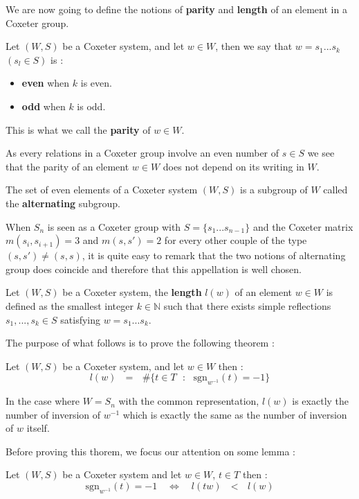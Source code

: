 \documentclass[envcountsame,envcountchap]{svmono}
\newcommand{\N}{\mathbb N}
\newcommand{\tg}[1]{\textbf{#1}}
\newcommand{\q}{\quad}
\newcommand{\qq}{\text{ }}
\begin{document}
	We are now going to define the notions of \tg{parity} and \tg{length} of an element in a Coxeter group. 
	\begin{definition}
		Let $(W,S)$ be a Coxeter system, and let $w\in W$, then we say that $w=s_1...s_k$ $(s_l\in S)$ is :
		\begin{itemize}
			\item \tg{even} when $k$ is even.
			\item \tg{odd} when $k$ is odd.
		\end{itemize}
	This is what we call the \tg{parity} of $w\in W$.
	\end{definition}
\begin{remark}
	As every relations in a Coxeter group involve an even number of $s\in S$ we see that the parity of an element $w\in W$ does not depend on its writing in $W$.
\end{remark}
The set of even elements of a Coxeter system $(W,S)$ is a subgroup of $W$ called the \tg{alternating} subgroup. 
\begin{remark}
	When $S_n$ is seen as a Coxeter group with $S=\{s_1...s_{n-1}\}$ and the Coxeter matrix $m(s_i,s_{i+1})=3$ and $m(s,s')=2$ for every other couple of the type $(s,s')\not=(s,s)$, it is quite easy to remark that the two notions of alternating group does coincide and therefore that this appellation is well chosen.
\end{remark}
\begin{definition}
	Let $(W,S)$ be a Coxeter system, the \tg{length} $l(w)$ of an element $w\in W$ is defined as the smallest integer $k\in \N$ such that there exists simple reflections $s_1,...,s_k\in S$ satisfying $w=s_1...s_k$.
\end{definition}
The purpose of what follows is to prove the following theorem :
\begin{theorem}\label{theorem sur le calcul des longueurs}
	Let $(W,S)$ be a Coxeter system, and let $w\in W$ then :
	\begin{equation}
	l(w)\qq=\qq \#\{t\in T\qq :\qq \mbox{sgn}_{w^{-1}}(t)=-1\}
	\end{equation}
\end{theorem}
\begin{example}
	In the case where $W=S_n$ with the common representation, $l(w)$ is exactly the number of inversion of $w^{-1}$ which is exactly the same as the number of inversion of $w$ itself.
\end{example}
Before proving this thorem, we focus our attention on some lemma :
\begin{lemma}\label{le lemme de la longueur de tw}
	Let $(W,S)$ be a Coxeter system and let $w\in W$, $t\in T$ then :
	\begin{equation}
	\mbox{sgn}_{w^{-1}}(t)=-1\q \iff \q l(tw)\qq<\qq l(w)
	\end{equation}
\end{lemma}
\end{document}
